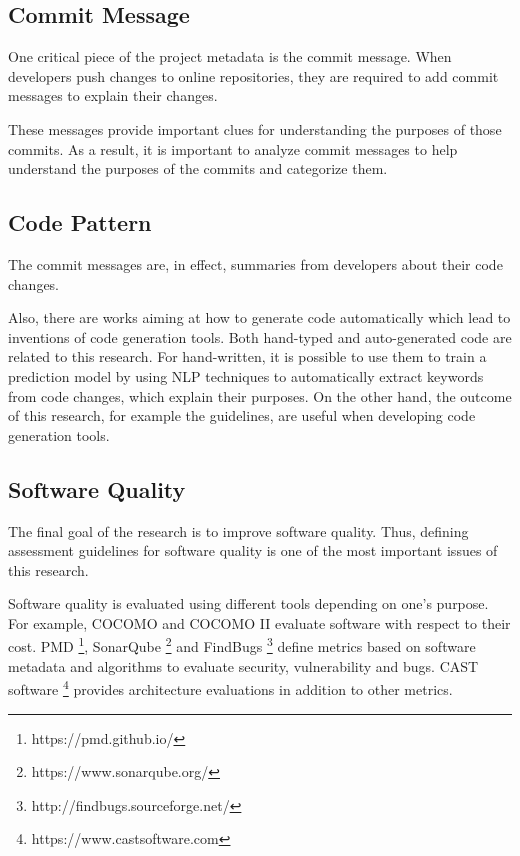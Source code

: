 \subsection{Commit Message}
One critical piece of the project metadata is the commit message. 
When developers push changes to online repositories, they are required to add commit messages to explain their changes.

These messages provide important clues for understanding the purposes of those commits. 
As a result, it is important to analyze commit messages to help understand the purposes of the commits and categorize them.

\subsection{Code Pattern}
The commit messages are, in effect, summaries from developers about their code changes.



Also, there are works aiming at how to generate code automatically which lead to inventions of code generation tools.
Both hand-typed and auto-generated code are related to this research.
For hand-written, it is possible to use them to train a prediction model by using NLP techniques to automatically extract keywords from code changes, which explain their purposes.
On the other hand, the outcome of this research, for example the guidelines, are useful when developing code generation tools.


\subsection{Software Quality}
The final goal of the research is to improve software quality.
Thus, defining assessment guidelines for software quality is one of the most important issues of this research.

Software quality is evaluated using different tools depending on one's purpose. 
For example, COCOMO and COCOMO II \cite{cocomo1995} evaluate software with respect to their cost. 
PMD \footnote{https://pmd.github.io/}, SonarQube \footnote{https://www.sonarqube.org/} and FindBugs \footnote{http://findbugs.sourceforge.net/} define metrics based on software metadata and algorithms to evaluate security, vulnerability and bugs. 
CAST software \footnote{https://www.castsoftware.com} provides architecture evaluations in addition to other metrics.

